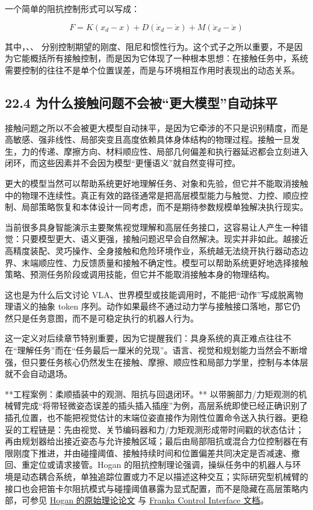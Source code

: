 一个简单的阻抗控制形式可以写成：

\begingroup
\footnotesize
\begin{equation*}
F = K(x_d - x) + D(\dot{x}_d - \dot{x}) + M(\ddot{x}_d - \ddot{x})
\end{equation*}
\endgroup

其中，\texttt{}、\texttt{}、\texttt{} 分别控制期望的刚度、阻尼和惯性行为。这个式子之所以重要，不是因为它能概括所有接触控制，而是因为它体现了一种根本思想：在接触任务中，系统需要控制的往往不是单个位置误差，而是与环境相互作用时表现出的动态关系。

\subsection*{22.4 为什么接触问题不会被“更大模型”自动抹平}


接触问题之所以不会被更大模型自动抹平，是因为它牵涉的不只是识别精度，而是高敏感、强非线性、局部突变且高度依赖具体身体结构的物理过程。接触一旦发生，力的传递、摩擦方向、材料顺应性、局部几何偏差和执行器延迟都会立刻进入闭环，而这些因素并不会因为模型“更懂语义”就自然变得可控。

更大的模型当然可以帮助系统更好地理解任务、对象和先验，但它并不能取消接触中的物理不连续性。真正有效的路径通常是把高层模型能力与触觉、力控、顺应控制、局部策略恢复和本体设计一同考虑，而不是期待参数规模单独解决执行现实。

当前很多具身智能演示主要聚焦视觉理解和高层任务接口，这容易让人产生一种错觉：只要模型更大、语义更强，接触问题迟早会自然解决。现实并非如此。越接近高精度装配、灵巧操作、全身接触和危险环境作业，系统越无法绕开执行器动态边界、末端顺应性、力反馈质量和接触不确定性。模型可以帮助系统更好地选择接触策略、预测任务阶段或调用技能，但它并不能取消接触本身的物理结构。

这也是为什么后文讨论 VLA、世界模型或技能调用时，不能把“动作”写成脱离物理语义的抽象 token 序列。动作如果最终不通过动力学与接触接口落地，那它仍然只是任务意图，而不是可稳定执行的机器人行为。

这一定义对后续章节特别重要，因为它提醒我们：具身系统的真正难点往往不在“理解任务”而在“任务最后一厘米的兑现”。语言、视觉和规划能力当然会不断增强，但只要任务核心仍然发生在接触、摩擦、顺应性和局部力学里，控制与本体层就不会自动退场。

**工程案例：柔顺插装中的观测、阻抗与回退闭环。** 以带腕部力/力矩观测的机械臂完成“将带轻微姿态误差的插头插入插座”为例，高层系统即使已经正确识别了插孔位置，也不能把视觉估计的末端位姿直接作为刚性位置命令送入执行器。更稳妥的工程链是：先由视觉、关节编码器和力/力矩观测形成带时间戳的状态估计；再由规划器给出接近姿态与允许接触区域；最后由局部阻抗或混合力位控制器在有限刚度下推进，并由碰撞阈值、接触持续时间和位置偏差共同决定是否减速、撤回、重定位或请求接管。Hogan 的阻抗控制理论强调，操纵任务中的机器人与环境是动态耦合系统，单独追踪位置或力不足以描述这种交互；实际研究型机械臂的接口也会把笛卡尔阻抗模式与碰撞阈值暴露为显式配置，而不是隐藏在高层策略内部，可参见 \href{https://newmanlab.mit.edu/wp-content/uploads/2017/09/1985-impedance-control-an-approach-to-manipulation-part-I-theory.pdf}{Hogan 的原始理论论文} 与 \href{https://support.franka.de/docs/libfranka.html}{Franka Control Interface 文档}。

